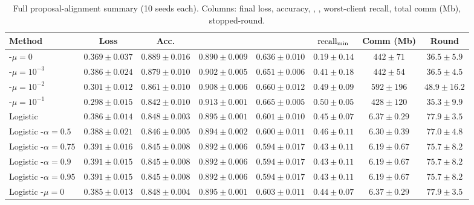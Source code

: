 \begin{table}[h]
\centering
\caption{Full proposal-alignment summary (10 seeds each). Columns:
final loss, accuracy, \auroc{}, \auprc{}, worst-client recall,
total comm (Mb), stopped-round.}
\label{tab:proposal-summary}
\scriptsize
\begin{tabularx}{\linewidth}{l c c c c c c c}
\toprule
Method & Loss & Acc. & \auroc{} & \auprc{} & $\text{recall}_{\min}{}$ & Comm (Mb) & Round\\
\midrule
\fedprox{}-$\mu\!=\!0$       & $0.369\!\pm\!0.037$ & $0.889\!\pm\!0.016$ & $0.890\!\pm\!0.009$ & $0.636\!\pm\!0.010$ & $0.19\!\pm\!0.14$ & $442\!\pm\!71$  & $36.5\!\pm\!5.9$ \\
\fedprox{}-$\mu\!=\!10^{-3}$ & $0.386\!\pm\!0.024$ & $0.879\!\pm\!0.010$ & $0.902\!\pm\!0.005$ & $0.651\!\pm\!0.006$ & $0.41\!\pm\!0.18$ & $442\!\pm\!54$  & $36.5\!\pm\!4.5$ \\
\fedprox{}-$\mu\!=\!10^{-2}$ & $0.301\!\pm\!0.012$ & $0.861\!\pm\!0.010$ & $0.908\!\pm\!0.006$ & $0.660\!\pm\!0.012$ & $0.49\!\pm\!0.09$ & $592\!\pm\!196$ & $48.9\!\pm\!16.2$ \\
\fedprox{}-$\mu\!=\!10^{-1}$ & $0.298\!\pm\!0.015$ & $0.842\!\pm\!0.010$ & $0.913\!\pm\!0.001$ & $0.665\!\pm\!0.005$ & $0.50\!\pm\!0.05$ & $428\!\pm\!120$ & $35.3\!\pm\!9.9$ \\
\midrule
Logistic \fedavg{}                      & $0.386\!\pm\!0.014$ & $0.848\!\pm\!0.003$ & $0.895\!\pm\!0.001$ & $0.601\!\pm\!0.010$ & $0.45\!\pm\!0.07$ & $6.37\!\pm\!0.29$ & $77.9\!\pm\!3.5$ \\
Logistic \cvar{}-$\alpha\!=\!0.5$       & $0.388\!\pm\!0.021$ & $0.846\!\pm\!0.005$ & $0.894\!\pm\!0.002$ & $0.600\!\pm\!0.011$ & $0.46\!\pm\!0.11$ & $6.30\!\pm\!0.39$ & $77.0\!\pm\!4.8$ \\
Logistic \cvar{}-$\alpha\!=\!0.75$      & $0.391\!\pm\!0.016$ & $0.845\!\pm\!0.008$ & $0.892\!\pm\!0.006$ & $0.594\!\pm\!0.017$ & $0.43\!\pm\!0.11$ & $6.19\!\pm\!0.67$ & $75.7\!\pm\!8.2$ \\
Logistic \cvar{}-$\alpha\!=\!0.9$       & $0.391\!\pm\!0.015$ & $0.845\!\pm\!0.008$ & $0.892\!\pm\!0.006$ & $0.594\!\pm\!0.017$ & $0.43\!\pm\!0.11$ & $6.19\!\pm\!0.67$ & $75.7\!\pm\!8.2$ \\
Logistic \cvar{}-$\alpha\!=\!0.95$      & $0.391\!\pm\!0.015$ & $0.845\!\pm\!0.008$ & $0.892\!\pm\!0.006$ & $0.594\!\pm\!0.017$ & $0.43\!\pm\!0.11$ & $6.19\!\pm\!0.67$ & $75.7\!\pm\!8.2$ \\
Logistic \fedprox{}-$\mu\!=\!0$         & $0.385\!\pm\!0.013$ & $0.848\!\pm\!0.004$ & $0.895\!\pm\!0.001$ & $0.603\!\pm\!0.011$ & $0.44\!\pm\!0.07$ & $6.37\!\pm\!0.29$ & $77.9\!\pm\!3.5$ \\

\end{tabularx}
\end{table}
